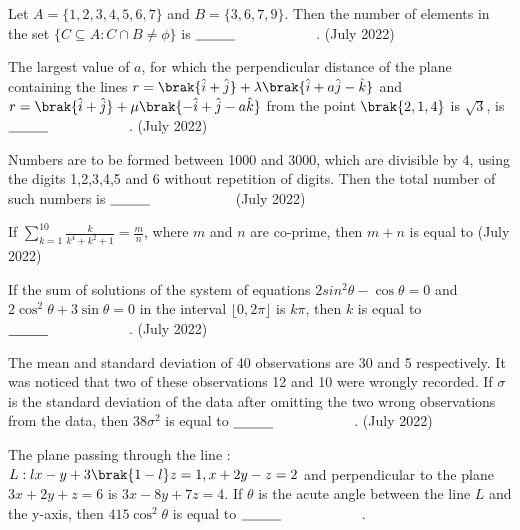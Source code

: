 \iffalse
\title{07-26-2022-shift-2-16-30}
\author{AI24BTECH11011}
\section{mains}
\fi
        \item Let $A=\{1,2,3,4,5,6,7\}$ and $B=\{3,6,7,9\}$. Then the number of elements in the set $\{C\subseteq A: C \cap B \neq \phi\}$ is $\makebox[3cm][l]{\underline{\hspace{1cm}}}$.
 \hfill{(July 2022)} 
 \item The largest value of $a$, for which the perpendicular distance of the plane containing the lines $r=\brak{\hat{i}+\hat{j}}+\lambda\brak{\hat{i}+a\hat{j}-\hat{k}}$ and $r=\brak{\hat{i}+\hat{j}}+\mu\brak{-\hat{i}+\hat{j}-a\hat{k}}$ from the point $\brak{2,1,4}$ is $\sqrt{3}$, is $\makebox[3cm][l]{\underline{\hspace{1cm}}}$.  
 \hfill{(July 2022)} 
 \item Numbers are to be formed between 1000 and 3000, which are divisible by 4, using the digits 1,2,3,4,5 and 6 without repetition of digits. Then the total number of such numbers is $\makebox[3cm][l]{\underline{\hspace{1cm}}}$
	\hfill{(July 2022)} 
 \item If $\sum_{k=1}^{10}\frac{k}{k^4+k^2+1}=\frac{m}{n}$, where $m$ and $n$ are co-prime, then $m+n$ is equal to
 \hfill{(July 2022)} 
 \item If the sum of solutions of the system of equations $2sin^{2}\theta-\cos\theta=0$ and $2\cos^{2}\theta+3\sin \theta=0$ in the interval $\lfloor 0,2\pi \rfloor$ is $k\pi$, then $k$ is equal to $\makebox[3cm][l]{\underline{\hspace{1cm}}}$.
 \hfill{(July 2022)} 
 \item The mean and standard deviation of 40 observations are 30 and 5 respectively. It was noticed that two of these observations 12 and 10 were wrongly recorded. If $\sigma$ is the standard deviation of the data after omitting the two wrong observations from the data, then $38\sigma^{2}$ is equal to $\makebox[3cm][l]{\underline{\hspace{1cm}}}$.
 \hfill{(July 2022)} 
 \item The plane passing through the line : $L:lx-y+3\brak{1-l}z=1,x+2y-z=2$ and perpendicular to the plane $3x+2y+z=6$ is $3x-8y+7z=4$. If $\theta$ is the acute angle between the line $L$ and the y-axis, then $415\cos^{2}\theta$ is equal to $\makebox[3cm][l]{\underline{\hspace{1cm}}}$.
